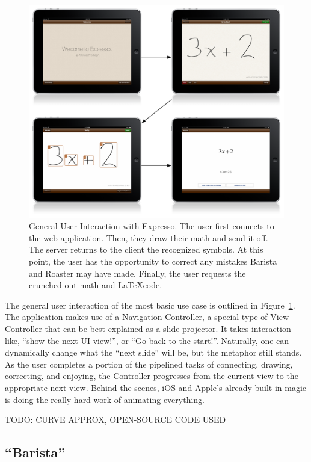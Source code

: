 \documentclass{acm_proc_article-sp}
\begin{document}
\begin{figure}
\centering
\includegraphics[width=1.0\textwidth]{user_workflow.pdf}
\caption{General User Interaction with Expresso. The user first connects to the web application. Then, they draw their math and send it off. The server returns to the client the recognized symbols. At this point, the user has the opportunity to correct any mistakes Barista and Roaster may have made. Finally, the user requests the crunched-out math and \LaTeX code.}
\label{fig:user_workflow}
\end{figure}

The general user interaction of the most basic use case is outlined in Figure~\ref{fig:user_workflow}. The application makes use of a Navigation Controller, a special type of View Controller that can be best explained as a slide projector. It takes interaction like, ``show the next UI view!'', or ``Go back to the start!''. Naturally, one can dynamically change what the ``next slide'' will be, but the metaphor still stands. As the user completes a portion of the pipelined tasks of connecting, drawing, correcting, and enjoying, the Controller progresses from the current view to the appropriate next view. Behind the scenes, iOS and Apple's already-built-in magic is doing the really hard work of animating everything.

TODO: CURVE APPROX, OPEN-SOURCE CODE USED

\subsection{``Barista''}
\end{document}
